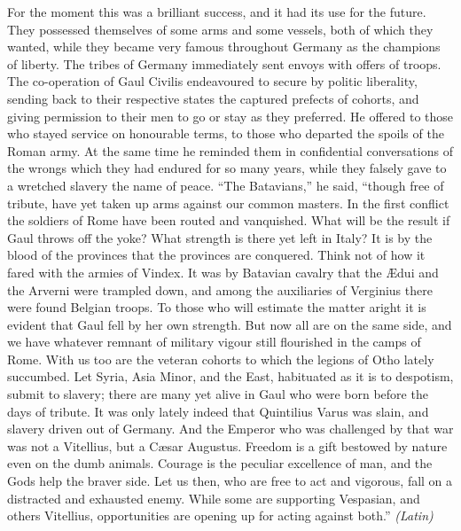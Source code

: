 For the moment this was a brilliant success, and it had its use for the future. They possessed themselves of some arms and some vessels, both of which they wanted, while they became very famous throughout Germany as the champions of liberty. The tribes of Germany immediately sent envoys with offers of troops. The co-operation of Gaul Civilis endeavoured to secure by politic liberality, sending back to their respective states the captured prefects of cohorts, and giving permission to their men to go or stay as they preferred. He offered to those who stayed service on honourable terms, to those who departed the spoils of the Roman army. At the same time he reminded them in confidential conversations of the wrongs which they had endured for so many years, while they falsely gave to a wretched slavery the name of peace. ``The Batavians,'' he said, ``though free of tribute, have yet taken up arms against our common masters. In the first conflict the soldiers of Rome have been routed and vanquished. What will be the result if Gaul throws off the yoke? What strength is there yet left in Italy? It is by the blood of the provinces that the provinces are conquered. Think not of how it fared with the armies of Vindex. It was by Batavian cavalry that the Ædui and the Arverni were trampled down, and among the auxiliaries of Verginius there were found Belgian troops. To those who will estimate the matter aright it is evident that Gaul fell by her own strength. But now all are on the same side, and we have whatever remnant of military vigour still flourished in the camps of Rome. With us too are the veteran cohorts to which the legions of Otho lately succumbed. Let Syria, Asia Minor, and the East, habituated as it is to despotism, submit to slavery; there are many yet alive in Gaul who were born before the days of tribute. It was only lately indeed that Quintilius Varus was slain, and slavery driven out of Germany. And the Emperor who was challenged by that war was not a Vitellius, but a Cæsar Augustus. Freedom is a gift bestowed by nature even on the dumb animals. Courage is the peculiar excellence of man, and the Gods help the braver side. Let us then, who are free to act and vigorous, fall on a distracted and exhausted enemy. While some are supporting Vespasian, and others Vitellius, opportunities are opening up for acting against both.'' \emph{(Latin)}


